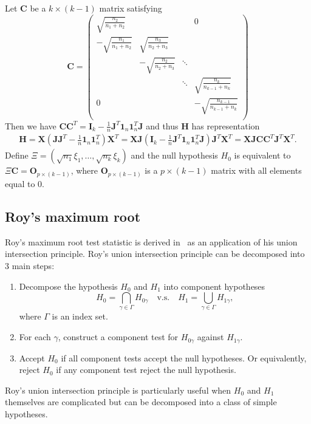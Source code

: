 \documentclass[12pt]{article} %
\newcommand{\bX}{\mathbf{X}}
\newcommand{\bH}{\mathbf{H}}
\newcommand{\bJ}{\mathbf{J}}
\newcommand{\bC}{\mathbf{C}}
\newcommand{\bO}{\mathbf{O}}
\newcommand{\bI}{\mathbf{I}}
\theoremstyle{definition}
\begin{document}
Let $\bC$ be a $k\times (k-1)$ matrix satisfying
$$
\bC=\begin{pmatrix}
    \sqrt{\frac{n_2}{n_1+n_2}}&&&0\\
    -\sqrt{\frac{n_1}{n_1+n_2}}&\sqrt{\frac{n_3}{n_2+n_3}}&&\\
    &-\sqrt{\frac{n_2}{n_2+n_3}}&\ddots&\\
    &&\ddots&\sqrt{\frac{n_k}{n_{k-1}+n_k}}\\
    0&&&-\sqrt{\frac{n_{k-1}}{n_{k-1}+n_k}}\\
\end{pmatrix}
$$
Then we have $\bC\bC^T=\bI_k-\frac{1}{n}\bJ^T\mathbf{1}_n \mathbf{1}_n^T \bJ$
and thus $\bH$ has representation
\begin{equation*}
    \begin{aligned}
        \bH=\bX(\bJ\bJ^T-\frac{1}{n}\mathbf{1}_n\mathbf{1}_n^T)\bX^T
=\bX \bJ(\bI_k-\frac{1}{n}\bJ^T\mathbf{1}_n \mathbf{1}_n^T \bJ)\bJ^T \bX^T
=\bX \bJ\bC \bC^T \bJ^T \bX^T.
    \end{aligned}
\end{equation*}
 Define $\Xi=(\sqrt{n_1}\xi_1,\ldots,\sqrt{n_k}\xi_k)$
 and the null hypothesis $H_0$ is equivalent to $\Xi \bC=\bO_{p\times (k-1)}$, where $\bO_{p\times (k-1)}$ is a $p\times (k-1)$ matrix with all elements equal to $0$.
\subsection{Roy's maximum root}
Roy's maximum root test statistic is derived in~\cite{Roy1953} as an application of his union intersection principle.
Roy's union intersection principle can be decomposed into $3$ main steps:
\begin{enumerate}
    \item
        Decompose the hypothesis $H_0$ and $H_1$ into component hypotheses
        $$
        H_0=\bigcap_{\gamma\in\Gamma} H_{0\gamma} \quad \text{v.s.} \quad 
        H_1=\bigcup_{\gamma\in \Gamma} H_{1\gamma},
        $$
        where $\Gamma$ is an index set.
    \item
        For each $\gamma$, construct a component test for $H_{0\gamma}$ against $H_{1\gamma}$.
    \item
        Accept $H_0$ if all component tests accept the null hypotheses.
        Or equivalently, reject $H_0$ if any component test reject the null hypothesis.
\end{enumerate}
Roy's union intersection principle is particularly useful when $H_0$ and $H_1$ themselves are complicated but can be decomposed into a class of simple hypotheses. %
\end{document}
